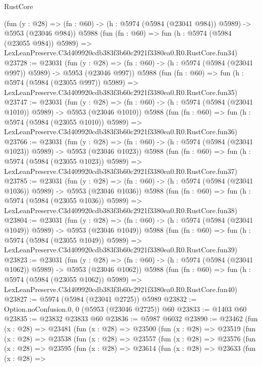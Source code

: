 \begin{lexlean}{RustCore}
\begin{coremodule}
    (fun (y : @28) => (fn : @60) -> (h : @5974 (@5984 (@23041 @984)) @5989) -> @5953 (@23046 @984))
    @5988
    (fun (fn : @60) =>
    fun (h : @5974 (@5984 (@23055 @984)) @5989) =>
    LexLeanPreserve.C3d409920cdb383f3b60c2921f3380ea0.R0.RustCore.fun34)
@23728 := @23031
    (fun (y : @28) => (fn : @60) -> (h : @5974 (@5984 (@23041 @997)) @5989) -> @5953 (@23046 @997))
    @5988
    (fun (fn : @60) =>
    fun (h : @5974 (@5984 (@23055 @997)) @5989) =>
    LexLeanPreserve.C3d409920cdb383f3b60c2921f3380ea0.R0.RustCore.fun35)
@23747 := @23031
    (fun (y : @28) =>
    (fn : @60) -> (h : @5974 (@5984 (@23041 @1010)) @5989) -> @5953 (@23046 @1010))
    @5988
    (fun (fn : @60) =>
    fun (h : @5974 (@5984 (@23055 @1010)) @5989) =>
    LexLeanPreserve.C3d409920cdb383f3b60c2921f3380ea0.R0.RustCore.fun36)
@23766 := @23031
    (fun (y : @28) =>
    (fn : @60) -> (h : @5974 (@5984 (@23041 @1023)) @5989) -> @5953 (@23046 @1023))
    @5988
    (fun (fn : @60) =>
    fun (h : @5974 (@5984 (@23055 @1023)) @5989) =>
    LexLeanPreserve.C3d409920cdb383f3b60c2921f3380ea0.R0.RustCore.fun37)
@23785 := @23031
    (fun (y : @28) =>
    (fn : @60) -> (h : @5974 (@5984 (@23041 @1036)) @5989) -> @5953 (@23046 @1036))
    @5988
    (fun (fn : @60) =>
    fun (h : @5974 (@5984 (@23055 @1036)) @5989) =>
    LexLeanPreserve.C3d409920cdb383f3b60c2921f3380ea0.R0.RustCore.fun38)
@23804 := @23031
    (fun (y : @28) =>
    (fn : @60) -> (h : @5974 (@5984 (@23041 @1049)) @5989) -> @5953 (@23046 @1049))
    @5988
    (fun (fn : @60) =>
    fun (h : @5974 (@5984 (@23055 @1049)) @5989) =>
    LexLeanPreserve.C3d409920cdb383f3b60c2921f3380ea0.R0.RustCore.fun39)
@23823 := @23031
    (fun (y : @28) =>
    (fn : @60) -> (h : @5974 (@5984 (@23041 @1062)) @5989) -> @5953 (@23046 @1062))
    @5988
    (fun (fn : @60) =>
    fun (h : @5974 (@5984 (@23055 @1062)) @5989) =>
    LexLeanPreserve.C3d409920cdb383f3b60c2921f3380ea0.R0.RustCore.fun40)
@23827 := @5974 (@5984 (@23041 @2725)) @5989
@23832 := Option.noConfusion.{0, 0} (@5953 (@23046 @2725)) @60
@23833 := @1403 @60
@23835 := @23832 @23833 @60
@23836 := @5987 @6032
@23890 := @23462
    (fun (x : @28) =>
    @23481
      (fun (x : @28) =>
      @23500
        (fun (x : @28) =>
        @23519
          (fun (x : @28) =>
          @23538
            (fun (x : @28) =>
            @23557
              (fun (x : @28) =>
              @23576
                (fun (x : @28) =>
                @23595
                  (fun (x : @28) =>
                  @23614
                    (fun (x : @28) =>
                    @23633
                      (fun (x : @28) =>

\end{coremodule}
\end{lexlean}
